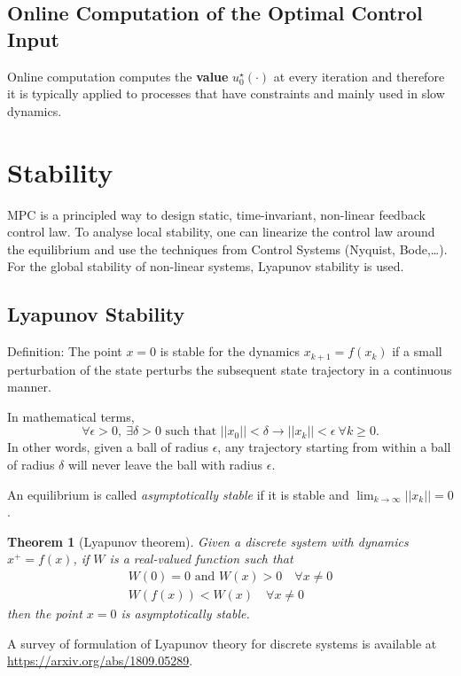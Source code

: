 \documentclass[11pt]{report}
\newtheorem{theorem}{Theorem}
\begin{document}
\subsection{Online Computation of the Optimal Control Input}
\label{sec:online-computation-MPC}

Online computation computes the \textbf{value} $u_0^\star(\cdot)$ at every iteration and therefore it is typically applied to processes that have constraints and mainly used in slow dynamics.

\section{Stability}
\label{sec:mpc-stability}

MPC is a principled way to design static, time-invariant, non-linear feedback control law. To analyse local stability, one can linearize the control law around the equilibrium and use the techniques from Control Systems (Nyquist, Bode,\ldots). For the global stability of non-linear systems, Lyapunov stability is used.

\subsection{Lyapunov Stability}
\label{sec:lyapunov-stability}

Definition: The point $x=0$ is stable for the dynamics $x_{k+1} = f(x_k)$ if a small perturbation of the state perturbs the subsequent state trajectory in a continuous manner.

In mathematical terms,
\begin{equation}
  \label{eq:lyapunov-stability-stable-equilibrium}
  \forall \epsilon > 0,\ \exists \delta > 0 \text{ such that } ||x_0|| < \delta \rightarrow ||x_k|| < \epsilon\ \forall k \ge 0.
\end{equation}
In other words, given a ball of radius $\epsilon$, any trajectory starting from within a ball of radius $\delta$ will never leave the ball with radius $\epsilon$.

An equilibrium is called \emph{asymptotically stable} if it is stable and $\lim_{k\rightarrow \infty} ||x_k||=0$.

\begin{theorem}[Lyapunov theorem]
  Given a discrete system with dynamics $x^+ = f(x)$, if $W$ is a   real-valued function such that
  \begin{align*}
    W(0)=0\text{ and }W(x)>0\quad \forall x\neq 0 \\
    W(f(x)) < W(x)\quad \forall x\neq 0
  \end{align*}
  then the point $x=0$ is asymptotically stable.
\end{theorem}
A survey of formulation of Lyapunov theory for discrete systems is available at \url{https://arxiv.org/abs/1809.05289}.
\end{document}
